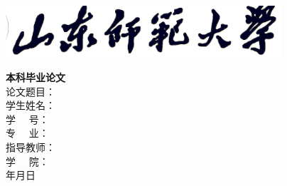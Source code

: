 \begin{titlepage}
	\vspace*{3mm}
	\begin{center}
		\includegraphics[width=0.77\textwidth,trim=8 0 0 0,clip]{data/resource/logo.jpg}
	\end{center}
	\vspace*{1cm}
	\fontsize{50pt}{24pt}
	\centering
	\textbf{本}\hfill\textbf{科}\hfill\textbf{毕}\hfill\textbf{业}\hfill\textbf{论}\hfill\textbf{文}
	\\
	\vspace*{7.7cm}
	论文题目：\underline{\makebox[\nlength]{\sdnutitlechs}}\\\vspace*{1mm}
	学生姓名：\underline{\makebox[\nlength]{\sdnuauthorchs}}\\\vspace*{1mm}
	学~ \quad ~号：\underline{\makebox[\nlength]{\sdnuauthorid}}\\\vspace*{1mm}
	专~ \quad ~业：\underline{\makebox[\nlength]{\sdnumajorchs}}\\\vspace*{1mm}
	指导教师：\underline{\makebox[\nlength]{\sdnumentorchs}}\\\vspace*{1mm}
	学~ \quad ~院：\underline{\makebox[\nlength]{\sdnucollegechs}}\\\vspace*{2.2cm}
	\sdnuyear 年\sdnumon 月\sdnuday 日
\end{titlepage}